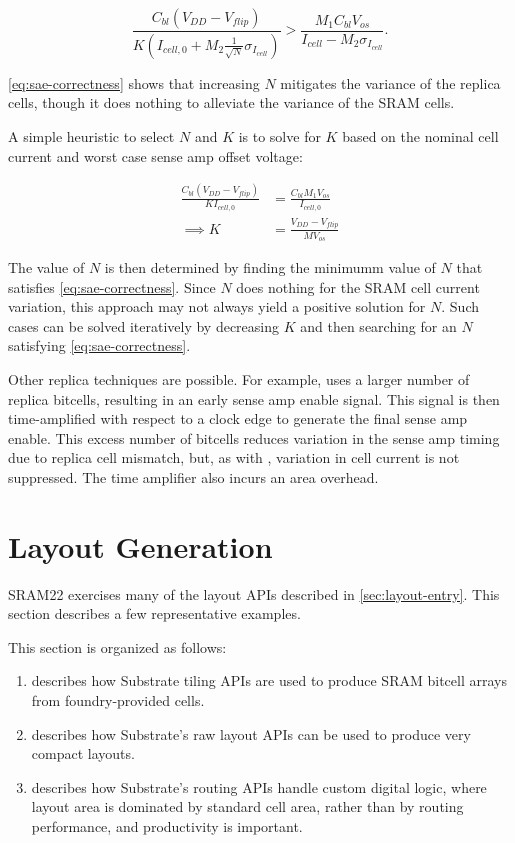 \begin{equation} \label{eq:sae-correctness}
\frac{C_{bl}  \left( V_{DD} - V_{flip}\right)}{K \left( I_{cell,0} + M_2 \frac{1}{\sqrt{N}} \sigma_{I_{cell}} \right)} >
\frac{M_1 C_{bl} V_{os}}{I_{cell} - M_2 \sigma_{I_{cell}}}.
\end{equation}

\ref{eq:sae-correctness} shows that increasing $N$ mitigates the variance of the replica cells,
though it does nothing to alleviate the variance of the SRAM cells.

A simple heuristic to select $N$ and $K$ is to solve for $K$ based on the nominal cell current and worst case
sense amp offset voltage:

\begin{align} \label{eq:k-heuristic}
\frac{C_{bl} \left( V_{DD} - V_{flip} \right) }{K I_{cell,0}}
&= \frac{C_{bl} M_1 V_{os}}{I_{cell,0}} \\
\implies K &= \frac{V_{DD} - V_{flip}}{M V_{os}}
\end{align}

The value of $N$ is then determined by finding the minimumm value of $N$ that satisfies \ref{eq:sae-correctness}.
Since $N$ does nothing for the SRAM cell current variation, this approach may not always yield a positive solution for $N$.
Such cases can be solved iteratively by decreasing $K$ and then searching for an $N$ satisfying \ref{eq:sae-correctness}.

Other replica techniques are possible. For example, \cite{niki} uses a larger number of replica bitcells,
resulting in an early sense amp enable signal. This signal is then time-amplified with respect to a clock edge
to generate the final sense amp enable. This excess number of bitcells reduces variation in the sense amp timing
due to replica cell mismatch, but, as with \cite{replicabl}, variation in cell current is not suppressed.
The time amplifier also incurs an area overhead.


\section{Layout Generation} \label{sec:sram-layout-generation}

SRAM22 exercises many of the layout APIs described in \ref{sec:layout-entry}.
This section describes a few representative examples.

This section is organized as follows:
\begin{enumerate}
\item {} describes how Substrate tiling APIs are used to produce SRAM bitcell arrays from foundry-provided cells.
\item {} describes how Substrate's raw layout APIs can be used to produce very compact layouts.
\item {} describes how Substrate's routing APIs handle custom digital logic, where layout area is dominated
  by standard cell area, rather than by routing performance, and productivity is important.
\end{enumerate}



